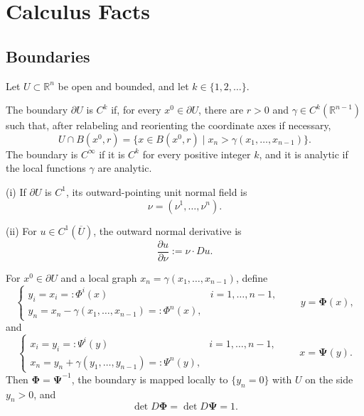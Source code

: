 
\section{Calculus Facts}
\label{sec:calculus-facts}

\subsection{Boundaries}

Let $U\subset\mathbb R^n$ be open and bounded, and let $k\in\{1,2,\ldots\}$.

\begin{definition}[$C^k$ boundary]
\label{def:ck-boundary-regularity}
The boundary $\partial U$ is $C^k$ if, for every $x^0\in\partial U$, there are $r>0$ and $\gamma\in C^k(\mathbb R^{n-1})$ such that, after relabeling and reorienting the coordinate axes if necessary,
\[
U\cap B(x^0,r)
=\{x\in B(x^0,r)\mid
x_n>\gamma(x_1,\ldots,x_{n-1})\}.
\]
The boundary is $C^\infty$ if it is $C^k$ for every positive integer $k$, and it is analytic if the local functions $\gamma$ are analytic.
\end{definition}

\begin{definition}
\label{def:outward-normal-and-normal-derivative}

(i) If $\partial U$ is $C^1$, its outward-pointing unit normal field is
\[
\nu=(\nu^1,\ldots,\nu^n).
\]

(ii) For $u\in C^1(\overline U)$, the outward normal derivative is
\[
\frac{\partial u}{\partial\nu}:=\nu\cdot Du.
\]
\end{definition}

For $x^0\in\partial U$ and a local graph $x_n=\gamma(x_1,\ldots,x_{n-1})$, define
\[
\begin{cases}
y_i=x_i=:\Phi^i(x) & i=1,\ldots,n-1,\\
y_n=x_n-\gamma(x_1,\ldots,x_{n-1})=:\Phi^n(x),
\end{cases}
\qquad y=\mathbf\Phi(x),
\]
and
\[
\begin{cases}
x_i=y_i=:\Psi^i(y) & i=1,\ldots,n-1,\\
x_n=y_n+\gamma(y_1,\ldots,y_{n-1})=:\Psi^n(y),
\end{cases}
\qquad x=\mathbf\Psi(y).
\]
Then $\mathbf\Phi=\mathbf\Psi^{-1}$, the boundary is mapped locally to $\{y_n=0\}$ with $U$ on the side $y_n>0$, and
\[
\det D\mathbf\Phi=\det D\mathbf\Psi=1.
\]

